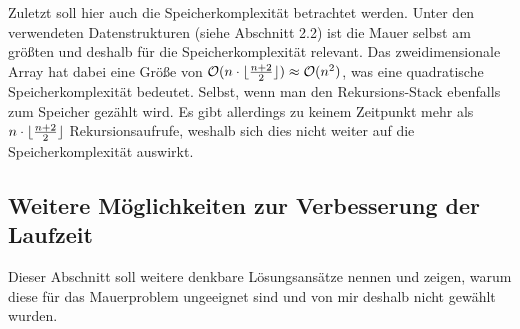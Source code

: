 \documentclass[a4paper, notitlepage, 12pt]{scrartcl}
\DeclarePairedDelimiter\floor{\lfloor}{\rfloor}
\begin{document}
Zuletzt soll hier auch die Speicherkomplexität betrachtet werden. Unter den verwendeten Datenstrukturen (siehe Abschnitt 2.2) ist die Mauer selbst am größten und deshalb für die Speicherkomplexität relevant. Das zweidimensionale Array hat dabei eine Größe von $\mathcal{O}(n \cdot \floor{\frac{n + 2}{2}}) \approx \mathcal{O}(n^2)$, was eine quadratische Speicherkomplexität bedeutet. Selbst, wenn man den Rekursions-Stack ebenfalls zum Speicher gezählt wird. Es gibt allerdings zu keinem Zeitpunkt mehr als $n \cdot \floor{\frac{n + 2}{2}}$ Rekursionsaufrufe, weshalb sich dies nicht weiter auf die Speicherkomplexität auswirkt.
\subsection{Weitere Möglichkeiten zur Verbesserung der Laufzeit}
Dieser Abschnitt soll weitere denkbare Lösungsansätze nennen und zeigen, warum diese für das Mauerproblem ungeeignet sind und von mir deshalb nicht gewählt wurden.
\end{document}
